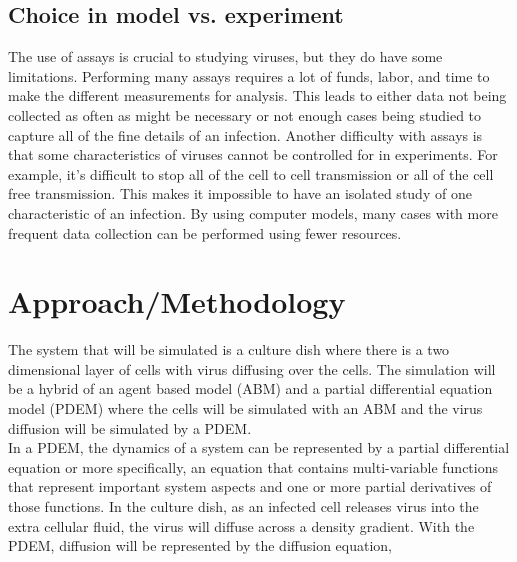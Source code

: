 \documentclass[a4paper]{article}
\begin{document}
\subsection{Choice in model vs. experiment}
The use of assays is crucial to studying viruses, but they do have some limitations. Performing many assays requires a lot of funds, labor, and time to make the different measurements for analysis. This leads to either data not being collected as often as might be necessary or not enough cases being studied to capture all of the fine details of an infection. Another difficulty with assays is that some characteristics of viruses cannot be controlled for in experiments. For example, it's difficult to stop all of the cell to cell transmission or all of the cell free transmission. This makes it impossible to have an isolated study of one characteristic of an infection. By using computer models, many cases with more frequent data collection can be performed using fewer resources.

\section{Approach/Methodology}

The system that will be simulated is a culture dish where there is a two dimensional layer of cells with virus diffusing over the cells. The simulation will be a hybrid of an agent based model (ABM) and a partial differential equation model (PDEM) where the cells will be simulated with an ABM and the virus diffusion will be simulated by a PDEM.
\\

In a PDEM, the dynamics of a system can be represented by a partial differential equation or more specifically, an equation that contains multi-variable functions that represent important system aspects and one or more partial derivatives of those functions. In the culture dish, as an infected cell releases virus into the extra cellular fluid, the virus will diffuse across a density gradient. With the PDEM, diffusion will be represented by the diffusion equation, 
\end{document}
